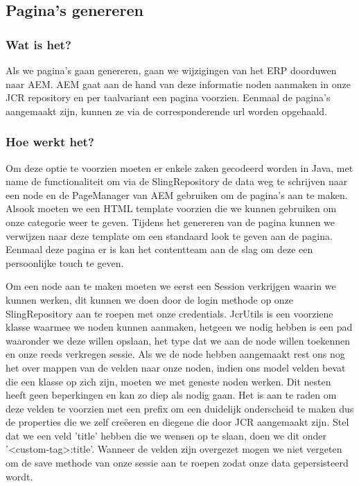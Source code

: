\documentclass{article}
\begin{document}
	\subsection{Pagina's genereren} 
	\subsubsection{Wat is het?}
	Als we pagina's gaan genereren, gaan we wijzigingen van het ERP doorduwen naar AEM. AEM gaat aan de hand van deze informatie noden aanmaken in onze JCR repository en per taalvariant een pagina voorzien. Eenmaal de pagina's aangemaakt zijn, kunnen ze via de corresponderende url worden opgehaald.
	\subsubsection{Hoe werkt het?}
	Om deze optie te voorzien moeten er enkele zaken gecodeerd worden in Java, met name de functionaliteit om via de SlingRepository de data weg te schrijven naar een node en de PageManager van AEM gebruiken om de pagina's aan te maken. Alsook moeten we een HTML template voorzien die we kunnen gebruiken om onze categorie weer te geven. Tijdens het genereren van de pagina kunnen we verwijzen naar deze template om een standaard look te geven aan de pagina. Eenmaal deze pagina er is kan het contentteam aan de slag om deze een persoonlijke touch te geven.
	\par
	Om een node aan te maken moeten we eerst een Session verkrijgen waarin we kunnen werken, dit kunnen we doen door de login methode op onze SlingRepository aan te roepen met onze credentials. JcrUtils is een voorziene klasse waarmee we noden kunnen aanmaken, hetgeen we nodig hebben is een pad waaronder we deze willen opslaan, het type dat we aan de node willen toekennen en onze reeds verkregen sessie. Als we de node hebben aangemaakt rest ons nog het over mappen van de velden naar onze noden, indien ons model velden bevat die een klasse op zich zijn, moeten we met geneste noden werken. Dit nesten heeft geen beperkingen en kan zo diep als nodig gaan. Het is aan te raden om deze velden te voorzien met een prefix om een duidelijk onderscheid te maken dus de properties die we zelf creëeren en diegene die door JCR aangemaakt zijn. Stel dat we een veld 'title' hebben die we wensen op te slaan, doen we dit onder '<custom-tag>:title'. Wanneer de velden zijn overgezet mogen we niet vergeten om de save methode van onze sessie aan te roepen zodat onze data gepersisteerd wordt.
	\par
\end{document}
